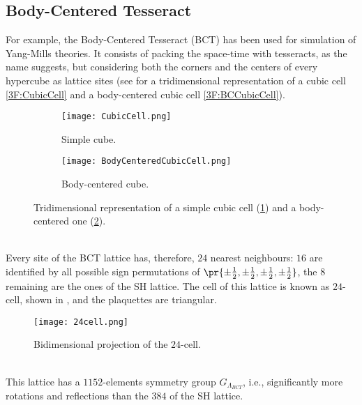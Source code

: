 \subsection{Body-Centered Tesseract\label{Sec3:BCT}}
For example, the Body-Centered Tesseract (BCT) has been used for simulation of Yang-Mills theories.
It consists of packing the space-time with tesseracts, as the name suggests, but considering both the corners and the centers of every hypercube as lattice sites (see  for a tridimensional representation of a cubic cell \eqref{3F:CubicCell} and a body-centered cubic cell \eqref{3F:BCCubicCell}).
\begin{figure}[!htbp]
    \centering
    \hspace{0.1\textwidth}
    \begin{subfigure}[b]{0.25\textwidth}
        \texttt{[image: CubicCell.png]}
        \caption{Simple cube.}
        \label{3F:CubicCell}
    \end{subfigure}
    \hspace{0.2\textwidth}
    \begin{subfigure}[b]{0.25\textwidth}
        \texttt{[image: BodyCenteredCubicCell.png]}
        \caption{Body-centered cube.}
        \label{3F:BCCubicCell}
    \end{subfigure}
    \hspace{0.2\textwidth}
    \caption{Tridimensional representation of a simple cubic cell (\ref{3F:CubicCell}) and a body-centered one (\ref{3F:BCCubicCell}).}
    \label{3F:ScBccCells}
\end{figure}\\
Every site of the BCT lattice has, therefore, $24$ nearest neighbours: $16$ are identified by all possible sign permutations of $\pr{\pm\frac12,\pm\frac12,\pm\frac12,\pm\frac12}$, the $8$ remaining are the ones of the SH lattice.
The cell of this lattice is known as $24$-cell, shown in , and the plaquettes are triangular.
\begin{figure}[!htbp]
    \centering
    \texttt{[image: 24cell.png]}
    \caption{Bidimensional projection of the $24$-cell.}
    \label{3F:24cell}
\end{figure}\\
This lattice has a $1152$-elements symmetry group $G_{\Lambda_{BCT}}$, i.e., significantly more rotations and reflections than the $384$ of the SH lattice.

